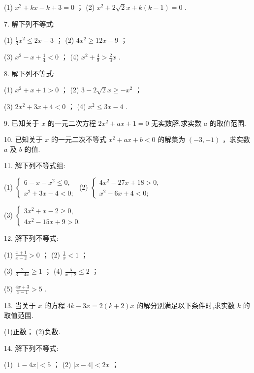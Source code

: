 \documentclass[10pt]{article}
\begin{document}
(1) \({x}^{2} + {kx} - k + 3 = 0\) ； (2) \({x}^{2} + {2\sqrt{2}}x + k\left( {k - 1}\right)  = 0\) .

7. 解下列不等式:

(1) \(\frac{1}{3}{x}^{2} \leq  {2x} - 3\) ； (2) \(4{x}^{2} \geq  {12x} - 9\) ；

(3) \({x}^{2} - x + \frac{1}{4} < 0\) ； (4) \({x}^{2} + \frac{4}{9} > \frac{2}{3}x\) .

8. 解下列不等式:

(1) \({x}^{2} + x + 1 > 0\) ； (2) \(3 - 2\sqrt{2}x \geq   - {x}^{2}\) ；

(3) \(2{x}^{2} + {3x} + 4 < 0\) ； (4) \({x}^{2} \leq  {3x} - 4\) .

9. 已知关于 \(x\) 的一元二次方程 \(2{x}^{2} + {ax} + 1 = 0\) 无实数解,求实数 \(a\) 的取值范围.

10. 已知关于 \(x\) 的一元二次不等式 \({x}^{2} + {ax} + b < 0\) 的解集为 \(\left( {-3, - 1}\right)\) ，求实数 \(a\) 及 \(b\) 的值.

11. 解下列不等式组:

(1) \(\left\{  \begin{array}{l} 6 - x - {x}^{2} \leq  0, \\  {x}^{2} + {3x} - 4 < 0; \end{array}\right.\) (2) \(\left\{  \begin{array}{l} 4{x}^{2} - {27x} + {18} > 0, \\  {x}^{2} - {6x} + 4 < 0; \end{array}\right.\)

(3) \(\left\{  \begin{array}{l} 3{x}^{2} + x - 2 \geq  0, \\  4{x}^{2} - {15x} + 9 > 0. \end{array}\right.\)

12. 解下列不等式:

(1) \(\frac{x + 1}{x - 2} > 0\) ； (2) \(\frac{1}{x} < 1\) ；

(3) \(\frac{2}{3 - {4x}} \geq  1\) ； (4) \(\frac{5}{x + 2} \leq  2\) ；

(5) \(\frac{{4x} + 3}{x - 1} > 5\) .

13. 当关于 \(x\) 的方程 \({4k} - {3x} = 2\left( {k + 2}\right) x\) 的解分别满足以下条件时,求实数 \(k\) 的取值范围.

(1)正数； (2)负数.

14. 解下列不等式:

(1) \(\left| {1 - {4x}}\right|  < 5\) ； (2) \(\left| {x - 4}\right|  < {2x}\) ；
\end{document}
